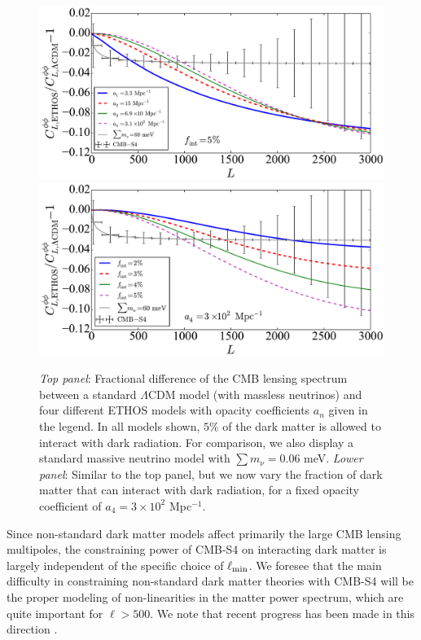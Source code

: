 %
\begin{figure}[htbp!]
\includegraphics[width=\textwidth]{DarkEnergy/ClsPP_ETHOS_a_n.pdf}\\
\includegraphics[width=\textwidth]{DarkEnergy/ClsPP_ETHOS_f_int.pdf}
\caption{\emph{Top panel}: Fractional difference of the CMB lensing spectrum between a standard $\Lambda$CDM model (with massless neutrinos) and four different ETHOS models with opacity coefficients $a_n$ given in the legend. In all models shown, $5\%$ of the dark matter is allowed to interact with dark radiation. For comparison, we also display a standard massive neutrino model with $\sum m_\nu =0.06$ meV. \emph{Lower panel}: Similar to the top panel, but we now vary the fraction of dark matter that can interact with dark radiation, for a fixed opacity coefficient of $a_4 = 3\times 10^2$ Mpc$^{-1}$. }\label{fig:Cls_phi_PIDM}
\end{figure}
%

Since non-standard dark matter models affect primarily the large CMB lensing multipoles, the constraining power of CMB-S4 on interacting dark matter is largely independent of the specific choice of $\ell_{\rm min}$. We foresee that the main difficulty in constraining non-standard dark matter theories with CMB-S4 will be the proper modeling of non-linearities in the matter power spectrum, which are quite important for $\ell > 500$. We note that recent progress has been made in this direction \cite{Vogelsberger:2015gpr}.


